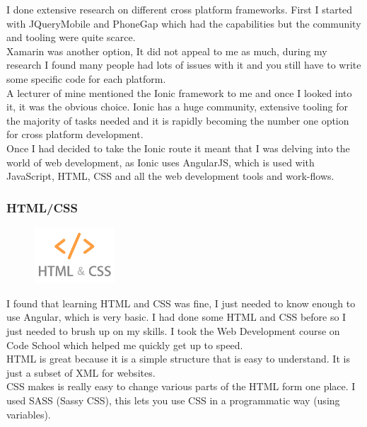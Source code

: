 I  done extensive research on different cross platform frameworks.
First I started with JQueryMobile and PhoneGap which had the capabilities but the community and tooling were quite scarce. 
\\ 

Xamarin was another option, It did not appeal to me as much, during my research I found many people had lots of issues with it and you still have to write some specific code for each platform.
\\ 

A lecturer of mine mentioned the Ionic framework to me and once I looked into it, it was the obvious choice.
Ionic has a huge community, extensive tooling for the majority of tasks needed and it is rapidly becoming the number one option for cross platform development.
\\

Once I had decided to take the Ionic route it meant that I was delving into the world of web development, as Ionic uses AngularJS, which is used with JavaScript, HTML, CSS and all the web development tools and work-flows.

\subsubsection{HTML/CSS}
\begin{figure}
\includegraphics[width=3cm]{img/mobile-app/logos/html-css.jpg}
\end{figure} 
I found that learning HTML \cite{html} and CSS \cite{css} was fine, I just needed to know enough to use Angular, which is very basic.
I had done some HTML and CSS before so I just needed to brush up on my skills.
I took the Web Development \cite{codeschool_webdev} course on Code School which helped me quickly get up to speed.
\\

HTML is great because it is a simple structure that is easy to understand.
It is just a subset of XML for websites.
\\

CSS makes is really easy to change various parts of the HTML form one place.
I used SASS (Sassy CSS), this lets you use CSS in a programmatic way (using variables).
\\

